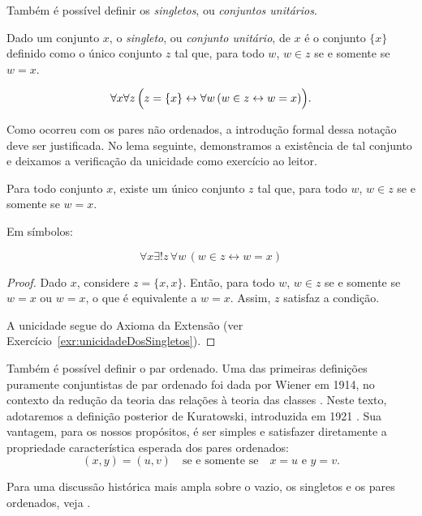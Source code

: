 Também é possível definir os \emph{singletos}, ou \emph{conjuntos unitários}.

\begin{definition}[$\BST$]\label{def:singleto}
    Dado um conjunto $x$, o \emph{singleto}, ou \emph{conjunto unitário}, de $x$ é o conjunto $\{x\}$ definido como o único conjunto $z$ tal que, para todo $w$, $w \in z$ se e somente se $w = x$.

    \[
        \forall x \forall z\, \Bigl(z = \{x\} \leftrightarrow \forall w\, (w \in z \leftrightarrow w = x)\Bigr).
    \]
\end{definition}

Como ocorreu com os pares não ordenados, a introdução formal dessa notação deve ser justificada.
No lema seguinte, demonstramos a existência de tal conjunto e deixamos a verificação da unicidade como exercício ao leitor.
\begin{lemma}[$\BST$]\label{lem:existenciaDeSingletos}
    Para todo conjunto $x$, existe um único conjunto $z$ tal que, para todo $w$, $w \in z$ se e somente se $w = x$.

    Em símbolos:

    \[
        \forall x \exists! z\, \forall w\, (w \in z \leftrightarrow w = x)
    \]
\end{lemma}
\begin{proof}
    Dado $x$, considere $z = \{x, x\}$.
    Então, para todo $w$, $w \in z$ se e somente se $w = x$ ou $w = x$, o que é equivalente a $w = x$.
    Assim, $z$ satisfaz a condição.

    A unicidade segue do Axioma da Extensão (ver Exercício~\ref{exr:unicidadeDosSingletos}).
\end{proof}

Também é possível definir o par ordenado.
Uma das primeiras definições puramente conjuntistas de par ordenado foi dada por Wiener em 1914, no contexto da redução da teoria das relações à teoria das classes \cite{wiener1914simplification}.
Neste texto, adotaremos a definição posterior de Kuratowski, introduzida em 1921 \cite{kuratowski1921notion}.
Sua vantagem, para os nossos propósitos, é ser simples e satisfazer diretamente a propriedade característica esperada dos pares ordenados:
\[
    (x,y)=(u,v) \quad\text{se e somente se}\quad x=u \text{ e } y=v.
\]

Para uma discussão histórica mais ampla sobre o vazio, os singletos e os pares ordenados, veja \cite{kanamori2003empty}.

